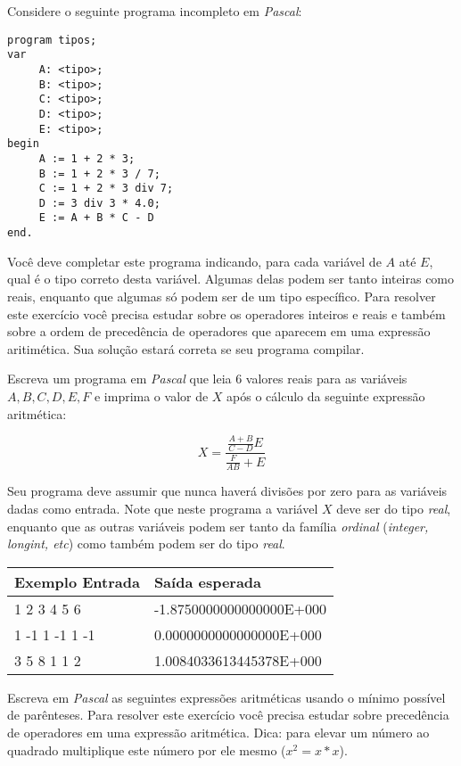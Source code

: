 \item Considere o seguinte programa incompleto em \emph{Pascal}:

\begin{lstlisting}
program tipos;
var 
     A: <tipo>;
     B: <tipo>;
     C: <tipo>;
     D: <tipo>;
     E: <tipo>;
begin
     A := 1 + 2 * 3;
     B := 1 + 2 * 3 / 7;
     C := 1 + 2 * 3 div 7;
     D := 3 div 3 * 4.0;
     E := A + B * C - D
end.
\end{lstlisting}

Você deve completar este programa indicando, para cada variável de $A$ até
$E$, qual é o tipo correto desta variável. Algumas delas podem ser tanto inteiras 
como reais, enquanto que algumas só podem ser de um tipo específico.
Para resolver este exercício você precisa estudar sobre os operadores
inteiros e reais e também sobre a ordem de precedência de operadores
que aparecem em uma expressão aritimética. Sua solução estará correta se seu 
programa compilar.

\item Escreva um programa em \emph{Pascal} que leia 
6 valores reais para as variáveis $A, B, C, D, E, F$ e 
imprima o valor de $X$ após o cálculo 
 da seguinte expressão aritmética:

\[ 
X = \frac{\frac{A + B}{C - D}E}{\frac{F}{AB} + E}
\]

Seu programa deve assumir que nunca haverá divisões por zero
para as variáveis dadas como entrada. Note que neste programa
a variável $X$ deve ser do tipo \emph{real}, enquanto que 
as outras variáveis podem ser tanto da família \emph{ordinal}
(\emph{integer, longint, etc}) como também podem ser do tipo
\emph{real}.

\begin{center}
\begin{tabular}{|l|l|} \hline
Exemplo Entrada & Saída esperada \\ \hline
1 2 3 4 5 6     & -1.8750000000000000E+000  \\ \hline
1 -1 1 -1 1 -1  & 0.0000000000000000E+000   \\ \hline
3 5 8 1 1 2     & 1.0084033613445378E+000   \\ \hline
\end{tabular}
\end{center}

\item Escreva em \emph{Pascal} as seguintes expressões
aritméticas usando o mínimo possível de parênteses.
Para resolver este exercício você precisa estudar sobre precedência
de operadores em uma expressão aritmética. Dica: para elevar um número
ao quadrado multiplique este número por ele mesmo ($x^2 = x * x$).

